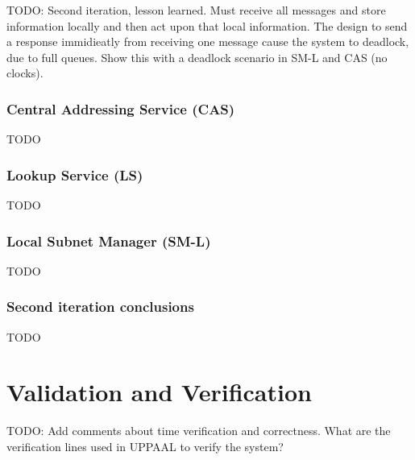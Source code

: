 TODO: Second iteration, lesson learned. Must receive all messages and store
information locally and then act upon that local information. The design to
send a response immidieatly from receiving one message cause the system to
deadlock, due to full queues. Show this with a deadlock scenario in SM-L and
CAS (no clocks).

\subsubsection{Central Addressing Service (CAS)}
TODO
\subsubsection{Lookup Service (LS)}
TODO
\subsubsection{Local Subnet Manager (SM-L)}
TODO
\subsubsection{Second iteration conclusions}
TODO

\section{Validation and Verification}
TODO: Add comments about time verification and correctness. What are the
verification lines used in UPPAAL to verify the system?

